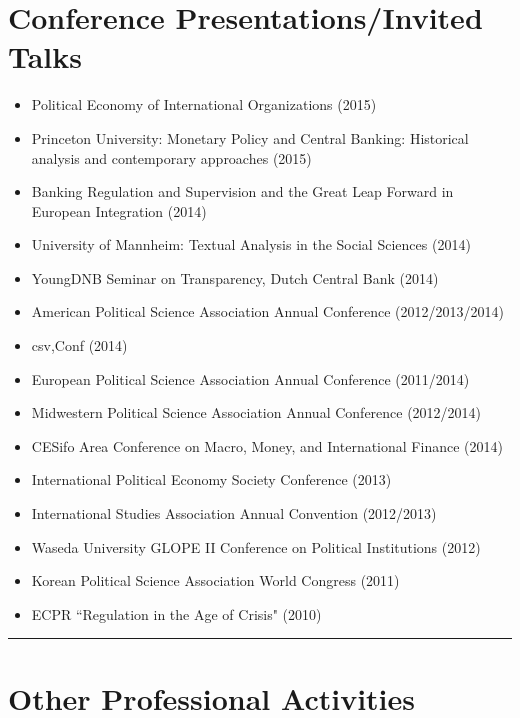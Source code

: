 \documentclass[a4paper]{article}
\begin{document}
{{\section*{Conference Presentations/Invited Talks}

\begin{itemize}
    \item Political Economy of International Organizations (2015)
    \item Princeton University: Monetary Policy and Central Banking: Historical analysis and contemporary approaches (2015)
    \item Banking Regulation and Supervision and the Great Leap Forward in European Integration (2014)
    \item University of Mannheim: Textual Analysis in the Social Sciences (2014)
    \item YoungDNB Seminar on Transparency, Dutch Central Bank (2014)
    \item American Political Science Association Annual Conference (2012/2013/2014)
    \item csv,Conf (2014)
    \item European Political Science Association Annual Conference (2011/2014)
    \item Midwestern Political Science Association Annual Conference (2012/2014)
    \item CESifo Area Conference on Macro, Money, and International Finance (2014)
    \item International Political Economy Society Conference (2013)
    \item International Studies Association Annual Convention (2012/2013)
    \item Waseda University GLOPE II Conference on Political Institutions (2012)
    \item Korean Political Science Association World Congress (2011)
    \item ECPR ``Regulation in the Age of Crisis" (2010)
\end{itemize}


\vspace{0.25cm}
\medskip\hrule height 1pt
\vspace{0.5cm}

\section*{Other Professional Activities}

}}
\end{document}
